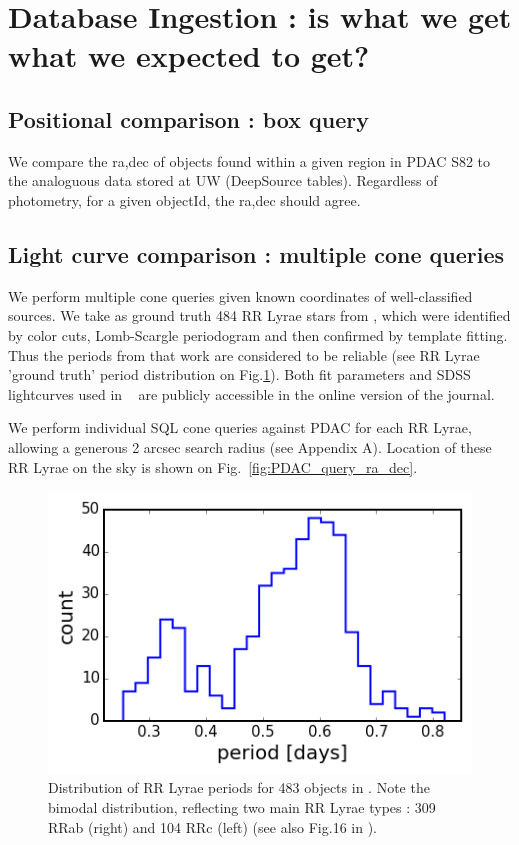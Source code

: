 \documentclass[DM,lsstdraft,toc,usenatbib]{lsstdoc}
\begin{document}
\section{Database Ingestion : is what we get what we expected to get? }
\label{sec:dg}


\subsection{Positional comparison : box query }

We compare the ra,dec of objects found within  a given region in PDAC S82 to the analoguous data stored at UW (DeepSource tables). Regardless of photometry, for a given objectId, the ra,dec should agree.  


\subsection{Light curve comparison : multiple cone queries }
\label{sec:rr_lyrae}

We perform multiple cone queries given known coordinates of well-classified sources.  We take as ground truth  484 RR Lyrae stars from   \cite{sesar2010} , which were identified by color cuts, Lomb-Scargle periodogram and then confirmed by template fitting.  Thus the periods from that work are considered to be reliable (see  RR Lyrae 'ground truth'  period distribution on Fig.\ref{fig:RRLyr_distribution}). Both fit parameters and  SDSS lightcurves used in ~\cite{sesar2010}  are publicly accessible in the online version of the journal.

We perform individual SQL  cone queries  against PDAC for each RR Lyrae, allowing a generous 2 arcsec search radius (see Appendix A). Location of these RR Lyrae on the sky is shown on Fig.~\ref{fig:PDAC_query_ra_dec}. 

\begin{figure}
\includegraphics[width=0.7\columnwidth]{figs/Fig_1_Sesar_2010_RRLyr}
\caption{ Distribution of RR Lyrae periods  for 483 objects in \citep{sesar2010}. Note the bimodal distribution, reflecting two main RR Lyrae types : 309 RRab (right) and 104 RRc (left) (see also Fig.16 in \citep{sesar2010}).}
\label{fig:RRLyr_distribution}
\end{figure}
\end{document}
